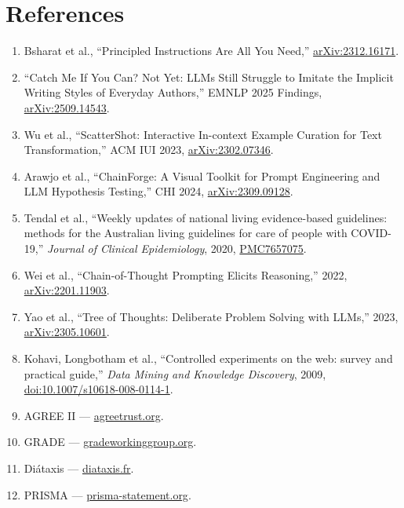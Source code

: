 \documentclass[11pt]{article}
\begin{document}
\section*{References}

\begin{enumerate}[nosep]
  \item Bsharat et al., ``Principled Instructions Are All You Need,''
        \href{https://arxiv.org/abs/2312.16171}{arXiv:2312.16171}.
  \item ``Catch Me If You Can? Not Yet: LLMs Still Struggle to Imitate
        the Implicit Writing Styles of Everyday Authors,'' EMNLP 2025
        Findings, \href{https://arxiv.org/abs/2509.14543}{arXiv:2509.14543}.
  \item Wu et al., ``ScatterShot: Interactive In-context Example
        Curation for Text Transformation,'' ACM IUI 2023,
        \href{https://arxiv.org/abs/2302.07346}{arXiv:2302.07346}.
  \item Arawjo et al., ``ChainForge: A Visual Toolkit for Prompt
        Engineering and LLM Hypothesis Testing,'' CHI 2024,
        \href{https://arxiv.org/abs/2309.09128}{arXiv:2309.09128}.
  \item Tendal et al., ``Weekly updates of national living
        evidence-based guidelines: methods for the Australian living
        guidelines for care of people with COVID-19,'' \emph{Journal
        of Clinical Epidemiology}, 2020,
        \href{https://pmc.ncbi.nlm.nih.gov/articles/PMC7657075/}{PMC7657075}.
  \item Wei et al., ``Chain-of-Thought Prompting Elicits Reasoning,''
        2022, \href{https://arxiv.org/abs/2201.11903}{arXiv:2201.11903}.
  \item Yao et al., ``Tree of Thoughts: Deliberate Problem Solving with
        LLMs,'' 2023, \href{https://arxiv.org/abs/2305.10601}{arXiv:2305.10601}.
  \item Kohavi, Longbotham et al., ``Controlled experiments on the
        web: survey and practical guide,'' \emph{Data Mining and
        Knowledge Discovery}, 2009,
        \href{https://doi.org/10.1007/s10618-008-0114-1}{doi:10.1007/s10618-008-0114-1}.
  \item AGREE II --- \href{https://www.agreetrust.org/}{agreetrust.org}.
  \item GRADE --- \href{https://www.gradeworkinggroup.org/}{gradeworkinggroup.org}.
  \item Di\'ataxis --- \href{https://diataxis.fr/}{diataxis.fr}.
  \item PRISMA --- \href{https://www.prisma-statement.org/}{prisma-statement.org}.
\end{enumerate}
\end{document}
